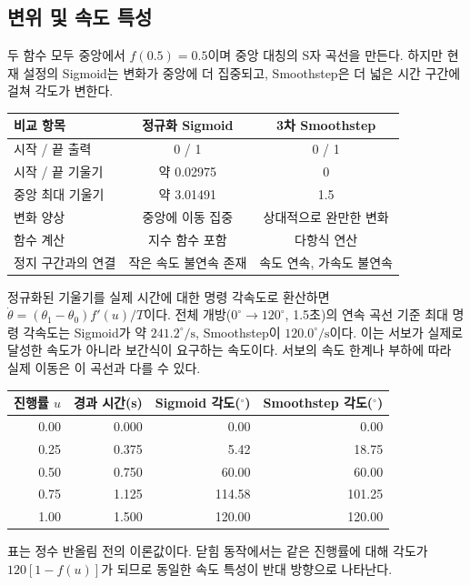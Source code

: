\documentclass[a4paper,10pt]{article}
\begin{document}
\subsection{변위 및 속도 특성}
두 함수 모두 중앙에서 $f(0.5)=0.5$이며 중앙 대칭의 S자 곡선을 만든다.
하지만 현재 설정의 Sigmoid는 변화가 중앙에 더 집중되고,
Smoothstep은 더 넓은 시간 구간에 걸쳐 각도가 변한다.
\begin{center}
\small
\begin{tabular}{@{}lcc@{}}
\toprule
비교 항목 & 정규화 Sigmoid & 3차 Smoothstep \\
\midrule
시작 / 끝 출력 & 0 / 1 & 0 / 1 \\
시작 / 끝 기울기 & 약 0.02975 & 0 \\
중앙 최대 기울기 & 약 3.01491 & 1.5 \\
변화 양상 & 중앙에 이동 집중 & 상대적으로 완만한 변화 \\
함수 계산 & 지수 함수 포함 & 다항식 연산 \\
정지 구간과의 연결 & 작은 속도 불연속 존재 & 속도 연속, 가속도 불연속 \\
\bottomrule
\end{tabular}
\end{center}
정규화된 기울기를 실제 시간에 대한 명령 각속도로 환산하면
$\dot{\theta}=(\theta_1-\theta_0)f'(u)/T$이다.
전체 개방($0^\circ\rightarrow120^\circ$, 1.5초)의 연속 곡선 기준 최대 명령 각속도는
Sigmoid가 약 $241.2^\circ/\mathrm{s}$, Smoothstep이 $120.0^\circ/\mathrm{s}$이다.
이는 서보가 실제로 달성한 속도가 아니라 보간식이 요구하는 속도이다.
서보의 속도 한계나 부하에 따라 실제 이동은 이 곡선과 다를 수 있다.

\begin{center}
\small
\begin{tabular}{@{}rrrr@{}}
\toprule
진행률 $u$ & 경과 시간(s) & Sigmoid 각도($^\circ$) & Smoothstep 각도($^\circ$) \\
\midrule
0.00 & 0.000 & 0.00 & 0.00 \\
0.25 & 0.375 & 5.42 & 18.75 \\
0.50 & 0.750 & 60.00 & 60.00 \\
0.75 & 1.125 & 114.58 & 101.25 \\
1.00 & 1.500 & 120.00 & 120.00 \\
\bottomrule
\end{tabular}
\end{center}
표는 정수 반올림 전의 이론값이다. 닫힘 동작에서는 같은 진행률에 대해
각도가 $120[1-f(u)]$가 되므로 동일한 속도 특성이 반대 방향으로 나타난다.
\end{document}
